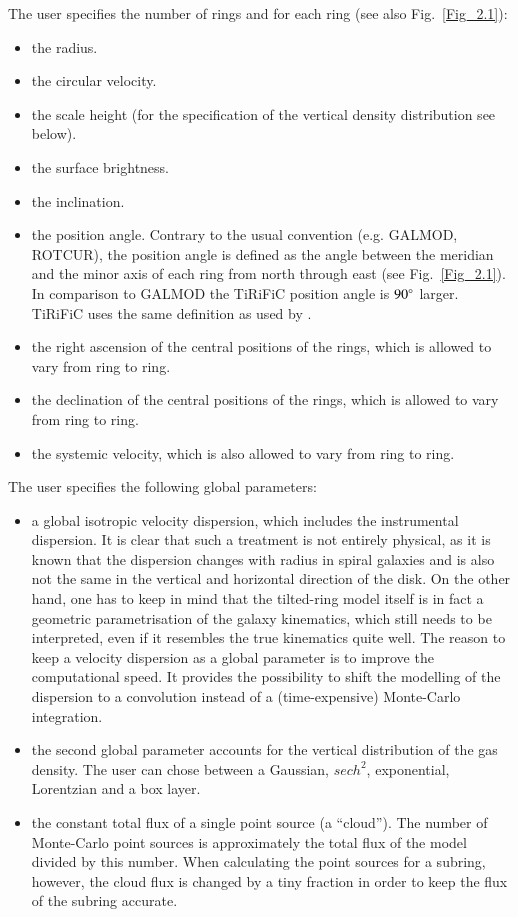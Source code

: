 \documentclass[oldversion]{aa}
\renewcommand{\deg}{\hbox{$^\circ$}}
\newcommand{\cng}[1]{{#1}}
\begin{document}
The user specifies the number of rings and for each ring (see also
Fig.~\ref{Fig_2.1}):
\begin{itemize}
\item the radius.
\item the circular velocity.
\item the scale height (for the specification of the vertical density distribution see
below).
\item the surface brightness.
\item the inclination.
\item the position angle. Contrary to the usual convention (e.g. GALMOD,
ROTCUR), the position angle is defined as the angle between the meridian
and the minor axis of each ring from north through east (see Fig.~\ref{Fig_2.1}). 
In comparison to GALMOD the TiRiFiC position angle is $90 \deg$ larger. 
 TiRiFiC uses the same  definition as used by \citet[][]{Briggs90}. 
\item the right ascension of the central positions of the rings, which
is allowed to vary from ring to ring.  \item the declination of the
central positions of the rings, which is allowed to vary from ring to
ring.  \item the systemic velocity, which is also allowed to vary from
ring to ring.  \end{itemize}

The user specifies the following global parameters:
\begin{itemize}

\item a global isotropic velocity dispersion, which includes the
instrumental dispersion.  It is clear that such a treatment is not
entirely physical, as it is known that the dispersion changes with
radius in spiral galaxies and is also not the same in \cng{the} vertical and
horizontal direction of the disk.  On the other hand, one has to keep in
mind that the tilted-ring model itself is in fact a geometric parametrisation of the galaxy kinematics,
which still needs to be interpreted, even if it resembles the
true kinematics quite well.  The reason to keep a velocity dispersion
as a global parameter is to improve the computational speed.  It
provides the possibility to shift the modelling of the dispersion to a
convolution instead of a (time-expensive) Monte-Carlo integration. 

\item the second global parameter accounts for the vertical distribution
of the gas density.  The user can chose between a Gaussian, $sech^2$,
exponential, Lorentzian and a box layer. 

\item the constant total flux of a single point source (a ``cloud''). 
The number of Monte-Carlo point sources is approximately the total flux
of the model divided by this number.  When calculating the point sources
for a subring, however, the cloud flux is changed by a tiny fraction in
order to keep the flux of the subring accurate.\end{itemize}
\end{document}

